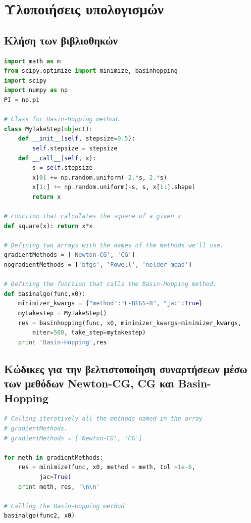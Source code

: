 \documentclass[a4paper,12pt,twoside]{report}
\theoremstyle{plain}
\theoremstyle{definition}
\theoremstyle{remark}
\begin{document}
\section{Υλοποιήσεις υπολογισμών}
\subsection{Κλήση των βιβλιοθηκών}
    
\begin{lstlisting}[extendedchars=true,caption= Η βασική εργαλειοθήκη,language=python]
import math as m
from scipy.optimize import minimize, basinhopping
import scipy
import numpy as np
PI = np.pi

# Class for Basin-Hopping method.
class MyTakeStep(object):
    def __init__(self, stepsize=0.5):
        self.stepsize = stepsize
    def __call__(self, x):
        s = self.stepsize
        x[0] += np.random.uniform(-2.*s, 2.*s)
        x[1:] += np.random.uniform(-s, s, x[1:].shape)
        return x
        
# Function that calculates the square of a given x        
def square(x): return x*x

# Defining two arrays with the names of the methods we'll use.
gradientMethods = ['Newton-CG', 'CG']
nogradientMethods = ['bfgs', 'Powell', 'nelder-mead']

# Defining the function that calls the Basin-Hopping method.
def basinalgo(func,x0):
    minimizer_kwargs = {"method":"L-BFGS-B", "jac":True}    
    mytakestep = MyTakeStep()
    res = basinhopping(func, x0, minimizer_kwargs=minimizer_kwargs, 
    	niter=500, take_step=mytakestep)
    print 'Basin-Hopping',res
\end{lstlisting}
            
\subsection{Κώδικες για την βελτιστοποίηση συναρτήσεων μέσω των μεθόδων Newton-CG, CG και Basin-Hopping}
    
\begin{lstlisting}[extendedchars=true,caption= {Κλήση των μεθόδων Newton-CG, CG και Basin-Hopping},language=python] 
# Calling iteratively all the methods named in the array 
# gradientMethods.
# gradientMethods = ['Newton-CG', 'CG']

for meth in gradientMethods:
    res = minimize(func, x0, method = meth, tol =1e-8, 
    	  jac=True)    
    print meth, res, '\n\n'

# Calling the Basin-Hopping method
basinalgo(func2, x0)
\end{lstlisting}
        
\end{document}
